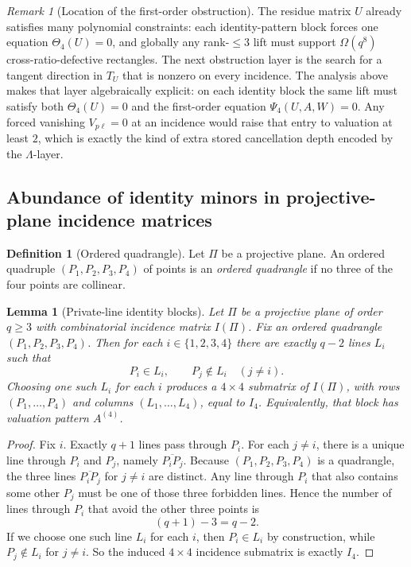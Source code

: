 \documentclass[11pt]{amsart}
\numberwithin{equation}{section}
\theoremstyle{plain}
\newtheorem{lemma}[theorem]{Lemma}
\theoremstyle{definition}
\newtheorem{definition}[theorem]{Definition}
\theoremstyle{remark}
\newtheorem{remark}[theorem]{Remark}
\newcommand{\Lam}{\Lambda}
\begin{document}
\begin{remark}[Location of the first-order obstruction]
\label{rem:first-order-bottleneck}
The residue matrix $U$ already satisfies many polynomial constraints: each identity-pattern block forces one equation $\Theta_4(U)=0$, and globally any rank-$\le 3$ lift must support $\Omega(q^8)$ cross-ratio-defective rectangles. The next obstruction layer is the search for a tangent direction in $T_U$ that is nonzero on every incidence. The analysis above makes that layer algebraically explicit: on each identity block the same lift must satisfy both $\Theta_4(U)=0$ and the first-order equation $\Psi_4(U,A,W)=0$.
Any forced vanishing $V_{p\ell}=0$ at an incidence would raise that entry to valuation at least $2$, which is exactly the kind of extra stored cancellation depth encoded by the $\Lam$-layer.
\end{remark}


\subsection{Abundance of identity minors in projective-plane incidence matrices}

\begin{definition}[Ordered quadrangle]
\label{def:ordered-quadrangle}
Let $\Pi$ be a projective plane. An ordered quadruple $(P_1,P_2,P_3,P_4)$ of points is an \emph{ordered quadrangle} if no three of the four points are collinear.
\end{definition}

\begin{lemma}[Private-line identity blocks]
\label{lem:private-line-identity-minors}
Let $\Pi$ be a projective plane of order $q\ge 3$ with combinatorial incidence matrix $I(\Pi)$.
Fix an ordered quadrangle $(P_1,P_2,P_3,P_4)$.
Then for each $i\in\{1,2,3,4\}$ there are exactly $q-2$ lines $L_i$ such that
\[
P_i\in L_i,
\qquad
P_j\notin L_i\quad (j\neq i).
\]
Choosing one such $L_i$ for each $i$ produces a $4\times4$ submatrix of $I(\Pi)$, with rows $(P_1,\dots,P_4)$ and columns $(L_1,\dots,L_4)$, equal to $I_4$.
Equivalently, that block has valuation pattern $A^{(4)}$.
\end{lemma}

\begin{proof}
Fix $i$. Exactly $q+1$ lines pass through $P_i$.
For each $j\neq i$, there is a unique line through $P_i$ and $P_j$, namely $\overline{P_iP_j}$.
Because $(P_1,P_2,P_3,P_4)$ is a quadrangle, the three lines $\overline{P_iP_j}$ for $j\neq i$ are distinct.
Any line through $P_i$ that also contains some other $P_j$ must be one of those three forbidden lines.
Hence the number of lines through $P_i$ that avoid the other three points is
\[
(q+1)-3=q-2.
\]
If we choose one such line $L_i$ for each $i$, then $P_i\in L_i$ by construction, while $P_j\notin L_i$ for $j\neq i$.
So the induced $4\times4$ incidence submatrix is exactly $I_4$.
\end{proof}
\end{document}
